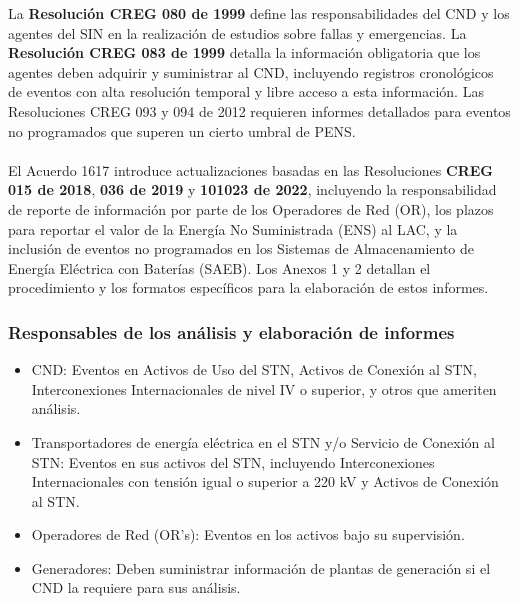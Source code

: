 \documentclass[a5paper]{book}%
\begin{document}
La \textbf{Resolución CREG 080 de 1999} define las responsabilidades del CND y los agentes del SIN en la realización de estudios sobre fallas y emergencias. La \textbf{Resolución CREG 083 de 1999} detalla la información obligatoria que los agentes deben adquirir y suministrar al CND, incluyendo registros cronológicos de eventos con alta resolución temporal y libre acceso a esta información. Las Resoluciones CREG 093 y 094 de 2012 requieren informes detallados para eventos no programados que superen un cierto umbral de PENS.\\\\

El Acuerdo 1617 introduce actualizaciones basadas en las Resoluciones \textbf{CREG 015 de 2018}, \textbf{036 de 2019} y \textbf{101023 de 2022}, incluyendo la responsabilidad de reporte de información por parte de los Operadores de Red (OR), los plazos para reportar el valor de la Energía No Suministrada (ENS) al LAC, y la inclusión de eventos no programados en los Sistemas de Almacenamiento de Energía Eléctrica con Baterías (SAEB). Los Anexos 1 y 2 detallan el procedimiento y los formatos específicos para la elaboración de estos informes.

\subsubsection{Responsables de los análisis y elaboración de informes}

\begin{itemize}
  
\item CND: Eventos en Activos de Uso del STN, Activos de Conexión al STN, Interconexiones Internacionales de nivel IV o superior, y otros que ameriten análisis.
    
  \item Transportadores de energía eléctrica en el \ac{STN} y/o Servicio de Conexión al \ac{STN}: Eventos en sus activos del \ac{STN}, incluyendo Interconexiones Internacionales con tensión igual o superior a 220 kV y Activos de Conexión al \ac{STN}.
  
  \item Operadores de Red (OR's): Eventos en los activos bajo su supervisión.
    
  \item Generadores: Deben suministrar información de plantas de generación si el \ac{CND} la requiere para sus análisis.

\end{itemize}
\end{document}
